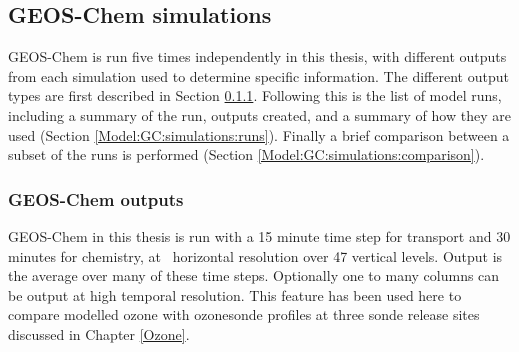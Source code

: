 
  
  \subsection{GEOS-Chem simulations}
    \label{Model:GC:simulations}
    
    GEOS-Chem is run five times independently in this thesis, with different outputs from each simulation used to determine specific information. 
    The different output types are first described in Section \ref{Model:GC:simulations:outputs}.
    Following this is the list of model runs, including a summary of the run, outputs created, and a summary of how they are used (Section \ref{Model:GC:simulations:runs}).
    Finally a brief comparison between a subset of the runs is performed (Section \ref{Model:GC:simulations:comparison}).


\subsubsection{GEOS-Chem outputs}
  \label{Model:GC:simulations:outputs}
  
  GEOS-Chem in this thesis is run with a 15 minute time step for transport and 30 minutes for chemistry, at \lowhr ~horizontal resolution over 47 vertical levels.
  Output is the average over many of these time steps.
  Optionally one to many columns can be output at high temporal resolution.
  This feature has been used here to compare modelled ozone with ozonesonde profiles at three sonde release sites discussed in Chapter \ref{Ozone}.
  
